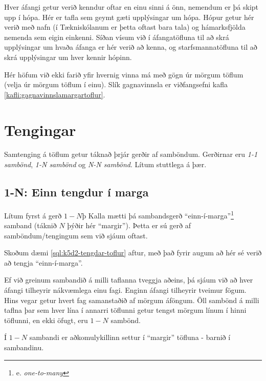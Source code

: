 \begin{example}
\caption[Hópar]{Hver áfangi getur verið kenndur oftar en einu sinni á önn, nemendum er þá skipt upp í hópa. Hér er tafla sem geymt gæti upplýsingar um hópa. Hópur getur hér verið með nafn (í Tækniskólanum er þetta oftast bara tala) og hámarksfjölda nemenda sem eigin einkenni. Síðan vísum við í áfangatöfluna til að skrá upplýsingar um hvaða áfanga er hér verið að kenna, og starfsmannatöfluna til að skrá upplýsingar um hver kennir hópinn.}
\label{sql:k5d5-hopar}
\centering
{}
\end{example}

Hér höfum við ekki farið yfir hvernig vinna má með gögn úr mörgum töflum (velja úr mörgum töflum í einu). Slík gagnavinnsla er viðfangsefni kafla \ref{kafli:gagnavinnslamargartoflur}.

\section{Tengingar} %
Samtenging á töflum getur táknað þrjár gerðir af samböndum. Gerðirnar eru \emph{1-1 sambönd}, \emph{1-N sambönd} og \emph{N-N sambönd}. Lítum stuttlega á þær.

\subsection{1-N: Einn tengdur í marga}
Lítum fyrst á gerð $1-N$þ Kalla mætti þá sambandsgerð ``einn-í-marga''\footnote{e. \emph{one-to-many}} samband (táknið $N$ þýðir hér ``margir''). Þetta er sú gerð af samböndum/tengingum sem við sjáum oftast.

Skoðum dæmi \ref{sql:k5d2-tengdar-toflur} aftur, með það fyrir augum að hér sé verið að tengja ``einn-í-marga''.

Ef við greinum sambandið á milli taflanna tveggja aðeins, þá sjáum við að hver áfangi tilheyrir nákvæmlega einu fagi. Enginn áfangi tilheyrir tveimur fögum. Hins vegar getur hvert fag samanstaðið af mörgum áföngum. Öll sambönd á milli taflna þar sem hver lína í annarri töflunni getur tengst mörgum línum í hinni töflunni, en ekki öfugt, eru $1-N$ sambönd.

Í $1-N$ sambandi er aðkomulykillinn settur í ``margir'' töfluna - barnið í sambandinu.
